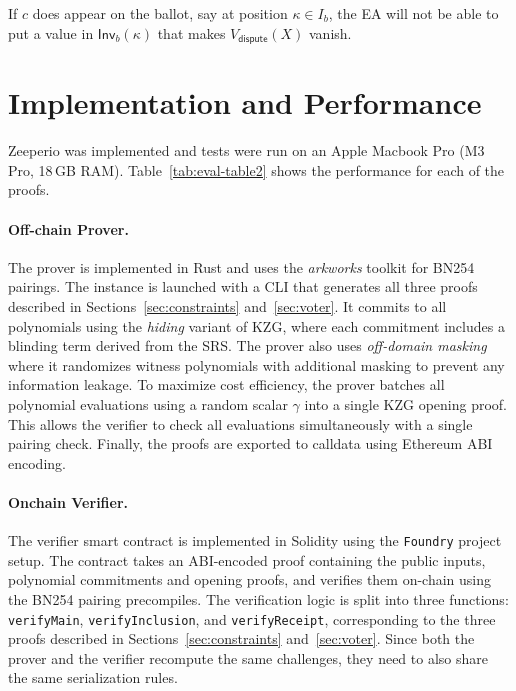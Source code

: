 \noindent If $c$ does appear on the ballot, say at position $\kappa\in I_b$, the EA will not be able to put a value in $\mathsf{Inv}_b(\kappa)$ that makes $V_{\mathsf{dispute}}(X)$ vanish. 

\section{Implementation and Performance}
Zeeperio was implemented and tests were run on an Apple Macbook Pro (M3 Pro, 18\,GB RAM). Table~\ref{tab:eval-table2} shows the performance for each of the proofs.\footnotemark 
{}

\paragraph{Off-chain Prover.}
The prover is implemented in Rust and uses the \emph{arkworks} toolkit for BN254 pairings. 
The instance is launched with a CLI that generates all three proofs described in Sections~\ref{sec:constraints} and~\ref{sec:voter}.
It commits to all polynomials using the \emph{hiding} variant of KZG, where each commitment includes a blinding term derived from the SRS. 
The prover also uses \emph{off-domain masking} where it randomizes witness polynomials with additional masking to prevent any information leakage.
To maximize cost efficiency, the prover batches all polynomial evaluations using a random scalar $\gamma$ into a single KZG opening proof.
This allows the verifier to check all evaluations simultaneously with a single pairing check.
Finally, the proofs are exported to calldata using Ethereum ABI encoding.
\paragraph{Onchain Verifier.}
The verifier smart contract is implemented in Solidity using the \texttt{Foundry} project setup. 
The contract takes an ABI-encoded proof containing the public inputs, polynomial commitments and opening proofs, 
and verifies them on-chain using the BN254 pairing precompiles. 
The verification logic is split into three functions: \texttt{verifyMain}, \texttt{verifyInclusion}, and \texttt{verifyReceipt},
corresponding to the three proofs described in Sections~\ref{sec:constraints} and~\ref{sec:voter}.
Since both the prover and the verifier recompute the same challenges, they need to also share the same serialization rules.

